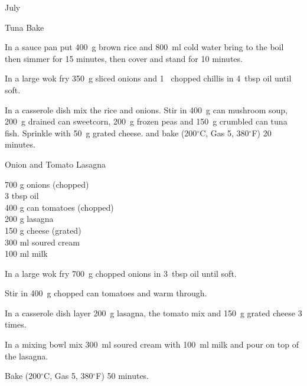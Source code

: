 \begin{menu}{July}
\begin{recipe}{2}{Tuna Bake}
\begin{ingredients}
		\end{ingredients}
	
    \begin{instructions}
    \item 
      In a
      sauce pan
      put
      400~g  brown rice
      and
      800~ml  cold water
      bring to the boil then simmer for 15 minutes,
      then cover and stand for 10 minutes.
    \item 
        In a large wok fry
        350~g sliced onions
        and
        1~ chopped chillis
        in
        4~tbsp  oil
        until soft.
      \item 
        In a casserole dish mix
        the rice and onions.
        Stir in
        400~g  can mushroom soup,
        200~g drained can sweetcorn,
        200~g  frozen peas
        and
        150~g crumbled can tuna fish.
        Sprinkle with
        50~g grated cheese.
        and
        bake (200$^{\circ}$C, Gas 5, 380$^{\circ}$F) 20 minutes.
      
    \end{instructions}
    \end{recipe}%
  
    \begin{recipe}{2}{Onion and Tomato Lasagna}%
		\begin{ingredients}
		700 g onions (chopped) \\
	3 tbsp oil  \\
	400 g can tomatoes (chopped) \\
	200 g lasagna  \\
	150 g cheese (grated) \\
	300 ml soured cream  \\
	100 ml milk  \\
	
		\end{ingredients}
	
	
    \begin{instructions}
    \item 
        In a large wok fry
        700~g chopped onions
        in
        3~tbsp  oil
        until soft.
      \item 
        Stir in 400~g chopped can tomatoes
        and warm through.
      \item 
        In a casserole dish layer
        200~g  lasagna,
        the tomato mix and
        150~g grated cheese
        3 times.
      \item 
        In a mixing bowl mix
        300~ml  soured cream
        with
        100~ml  milk
        and pour on top of the lasagna.
      \item 
        Bake (200$^{\circ}$C, Gas 5, 380$^{\circ}$F) 50 minutes.
      

\end{instructions}
\end{recipe}
\end{menu}
